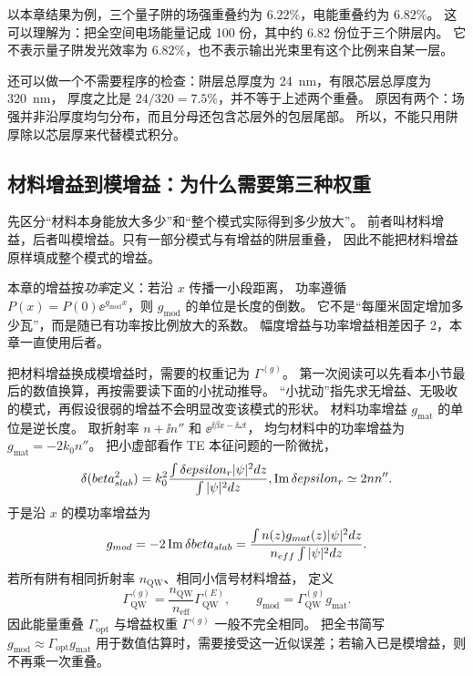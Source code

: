 以本章结果为例，三个量子阱的场强重叠约为 $6.22\%$，电能重叠约为 $6.82\%$。
这可以理解为：把全空间电场能量记成 100 份，其中约 6.82 份位于三个阱层内。
它不表示量子阱发光效率为 $6.82\%$，也不表示输出光束里有这个比例来自某一层。

还可以做一个不需要程序的检查：阱层总厚度为 \SI{24}{nm}，有限芯层总厚度为 \SI{320}{nm}，
厚度之比是 $24/320=7.5\%$，并不等于上述两个重叠。
原因有两个：场强并非沿厚度均匀分布，而且分母还包含芯层外的包层尾部。
所以，不能只用阱厚除以芯层厚来代替模式积分。

\subsection{材料增益到模增益：为什么需要第三种权重}
先区分“材料本身能放大多少”和“整个模式实际得到多少放大”。
前者叫材料增益，后者叫模增益。只有一部分模式与有增益的阱层重叠，
因此不能把材料增益原样填成整个模式的增益。

本章的增益按\emph{功率}定义：若沿 $x$ 传播一小段距离，
功率遵循 $P(x)=P(0)\ee^{g_{\mathrm{mod}}x}$，则 $g_{\mathrm{mod}}$ 的单位是长度的倒数。
它不是“每厘米固定增加多少瓦”，而是随已有功率按比例放大的系数。
幅度增益与功率增益相差因子 2，本章一直使用后者。

把材料增益换成模增益时，需要的权重记为 $\Gamma^{(g)}$。
第一次阅读可以先看本小节最后的数值换算，再按需要读下面的小扰动推导。
“小扰动”指先求无增益、无吸收的模式，再假设很弱的增益不会明显改变该模式的形状。
材料功率增益 $g_{\mathrm{mat}}$ 的单位是逆长度。
取折射率 $n+\ii n''$ 和 $\ee^{\ii\beta x-\ii\omega t}$，
均匀材料中的功率增益为 $g_{\mathrm{mat}}=-2k_0n''$。
把小虚部看作 TE 本征问题的一阶微扰，
\[
\delta(\betaslab^2)=
k_0^2\frac{\int\delta\varepsilon_r|\psi|^2\dd z}{\int|\psi|^2\dd z},
\qquad
\operatorname{Im}\delta\varepsilon_r\simeq2nn''.
\]
于是沿 $x$ 的模功率增益为
\begin{equation}
g_{mod}=-2\operatorname{Im}\delta beta_{slab}
=\frac{\int n(z)g_{mat}(z)|\psi|^2d z}
{n_{eff}\int|\psi|^2d z}.
\label{eq:gmod_overlap_epi}
\end{equation}
若所有阱有相同折射率 $n_{\mathrm{QW}}$、相同小信号材料增益，
定义
\begin{equation}
\Gamma_{\mathrm{QW}}^{(g)}
=\frac{n_{\mathrm{QW}}}{n_{\mathrm{eff}}}\Gamma_{\mathrm{QW}}^{(E)},
\qquad
g_{\mathrm{mod}}=\Gamma_{\mathrm{QW}}^{(g)}g_{\mathrm{mat}}.
\label{eq:gmod_gamma_epi}
\end{equation}
因此能量重叠 $\Gamma_{\mathrm{opt}}$ 与增益权重 $\Gamma^{(g)}$ 一般不完全相同。
把全书简写 $g_{\mathrm{mod}}\approx\Gamma_{\mathrm{opt}}g_{\mathrm{mat}}$
用于数值估算时，需要接受这一近似误差；若输入已是模增益，则不再乘一次重叠。

